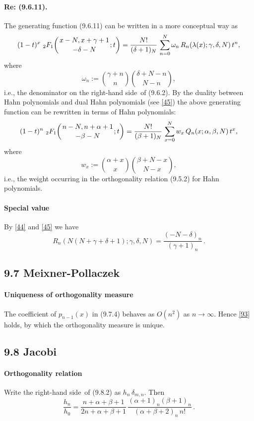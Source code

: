 \documentclass[twoside,11pt]{article}
\newcommand\al\alpha
\newcommand\be\beta
\newcommand\ga\gamma
\newcommand\de\delta
\newcommand\la\lambda
\newcommand\om\omega
\newcommand\iy\infty
\newcommand{\hyp}[5]{\,\mbox{}_{#1}F_{#2}\!\left(
  \genfrac{}{}{0pt}{}{#3}{#4};#5\right)}
\newcommand\RHS{right-hand side}
\begin{document}
\paragraph{Re: (9.6.11).}
The generating function (9.6.11) can be written in a more conceptual way as
\begin{equation}
(1-t)^x\,\hyp21{x-N,x+\ga+1}{-\de-N}t=\frac{N!}{(\de+1)_N}\,
\sum_{n=0}^N \om_n\,R_n(\la(x);\ga,\de,N)\,t^n,
\label{2}
\end{equation}
where
\begin{equation}
\om_n:=\binom{\ga+n}n \binom{\de+N-n}{N-n},
\label{3}
\end{equation}
i.e., the denominator on the \RHS\ of (9.6.2).
By the duality between Hahn polynomials and dual Hahn polynomials (see \eqref{45}) the above generating function can be rewritten in
terms of Hahn polynomials:
\begin{equation}
(1-t)^n\,\hyp21{n-N,n+\al+1}{-\be-N}t=\frac{N!}{(\be+1)_N}\,
\sum_{x=0}^N w_x\,Q_n(x;\al,\be,N)\,t^x,
\label{4}
\end{equation}
where
\begin{equation}
w_x:=\binom{\al+x}x \binom{\be+N-x}{N-x},
\label{5}
\end{equation}
i.e., the weight occurring in the orthogonality relation (9.5.2)
for Hahn polynomials.
%
\paragraph{Special value}
By \eqref{44} and \eqref{45} we have
\begin{equation}
R_n(N(N+\ga+\de+1);\ga,\de,N)=\frac{(-N-\de)_n}{(\ga+1)_n}\,.
\label{47}
\end{equation}
%
\subsection*{9.7 Meixner-Pollaczek}
%
\paragraph{Uniqueness of orthogonality measure}
The coefficient of $p_{n-1}(x)$ in (9.7.4) behaves as $O(n^2)$ as $n\to\iy$.
Hence \eqref{93} holds, by which the orthogonality measure is unique.
%
\subsection*{9.8 Jacobi}
%
\paragraph{Orthogonality relation}
Write the \RHS\ of (9.8.2) as $h_n\,\de_{m,n}$. Then
\begin{equation}
\frac{h_n}{h_0}=
\frac{n+\al+\be+1}{2n+\al+\be+1}\,
\frac{(\al+1)_n(\be+1)_n}{(\al+\be+2)_n\,n!}\,.
\label{60}
\end{equation}
%
\end{document}
